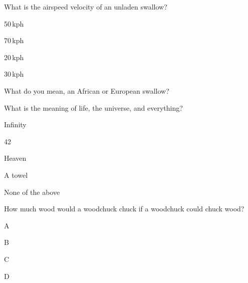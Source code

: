 \documentclass[11pt,nochoiceboxes,solutions,internaltesting]{exam3}
\begin{document}
\begin{multicols*}{2}
\raggedcolumns

\problemwidth{\columnwidth}

%
%

\begin{problem}{2}
  What is the airspeed velocity of an unladen swallow?
  \begin{multichoice}[order=badce]
    \item 50\,kph
    \item 70\,kph
    \item 20\,kph
    \item 30\,kph
    \item *What do you mean, an African or European swallow?
  \end{multichoice}
\end{problem}

%
%
\begin{problem}{2}
  What is the meaning of life, the universe, and everything?
  \begin{multichoice}[set=E]
    \item Infinity
    \item *42
    \item Heaven
    \item A towel
    \item None of the above
  \end{multichoice}
\end{problem}

%
%
\begin{problem}{2}
  How much wood would a woodchuck chuck if a woodchuck could chuck wood?
  \begin{multichoice}[v1=abcde,v2=edcba,v3=abedc,v4=cdeba]
    \item *A
    \item B
    \item C
    \item D
  \end{multichoice}
\end{problem}

\end{multicols*}

\showpoints
\end{document}
